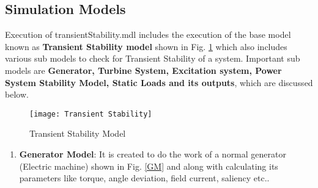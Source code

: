 \subsection{Simulation Models}
Execution of transientStability.mdl includes the execution of the base model known as \textbf{Transient Stability model} shown in Fig. \ref{TSM} which also includes various sub models to check for Transient Stability of a system. Important sub models are \textbf{Generator, Turbine System, Excitation system, Power System Stability Model, Static Loads and its outputs}, which are discussed below. 
\begin{figure}[H]
	\texttt{[image: Transient Stability]}
	\caption{Transient Stability Model}
	\label{TSM}
	\end{figure}
	
\begin{enumerate}
\item \textbf{\large Generator Model}: It is created to do the work of a normal generator (Electric machine) shown in Fig. \ref{GM} and along with calculating its parameters like torque, angle deviation, field current, saliency etc..
	

\end{enumerate}
